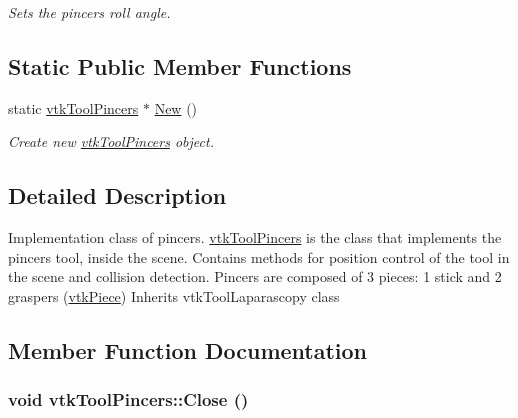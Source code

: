 \begin{DoxyCompactItemize}
\begin{DoxyCompactList}\small\item\em Sets the pincers roll angle. \item\end{DoxyCompactList}\end{DoxyCompactItemize}
\subsection*{Static Public Member Functions}
\begin{DoxyCompactItemize}
\item 
\hypertarget{classvtkToolPincers_af39bbc40147ab2f325c1ff6c17e10361}{
static \hyperlink{classvtkToolPincers}{vtkToolPincers} $\ast$ \hyperlink{classvtkToolPincers_af39bbc40147ab2f325c1ff6c17e10361}{New} ()}
\label{classvtkToolPincers_af39bbc40147ab2f325c1ff6c17e10361}

\begin{DoxyCompactList}\small\item\em Create new \hyperlink{classvtkToolPincers}{vtkToolPincers} object. \item\end{DoxyCompactList}\end{DoxyCompactItemize}


\subsection{Detailed Description}
Implementation class of pincers. \hyperlink{classvtkToolPincers}{vtkToolPincers} is the class that implements the pincers tool, inside the scene. Contains methods for position control of the tool in the scene and collision detection. Pincers are composed of 3 pieces: 1 stick and 2 graspers (\hyperlink{classvtkPiece}{vtkPiece}) Inherits vtkToolLaparascopy class 

\subsection{Member Function Documentation}
\hypertarget{classvtkToolPincers_ab32a090979f21b03f57347c4635d2b76}{
\subsubsection[{Close}]{\setlength{\rightskip}{0pt plus 5cm}void vtkToolPincers::Close ()}}
\label{classvtkToolPincers_ab32a090979f21b03f57347c4635d2b76}



